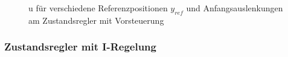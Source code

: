 \documentclass[
	pagesize,
	fontsize=12pt,
	paper=a4,
	oneside,
   reqno
]{scrartcl}
\begin{document}
\begin{figure}[H]
    \centering
    \caption[u für Regler mit Vorsteuerung]{u für verschiedene Referenzpositionen $y_{ref}$ und Anfangsauslenkungen am Zustandsregler mit Vorsteuerung}
    \label{fig:Bild17}
\end{figure}

\subsubsection{Zustandsregler mit I-Regelung}
\end{document}
